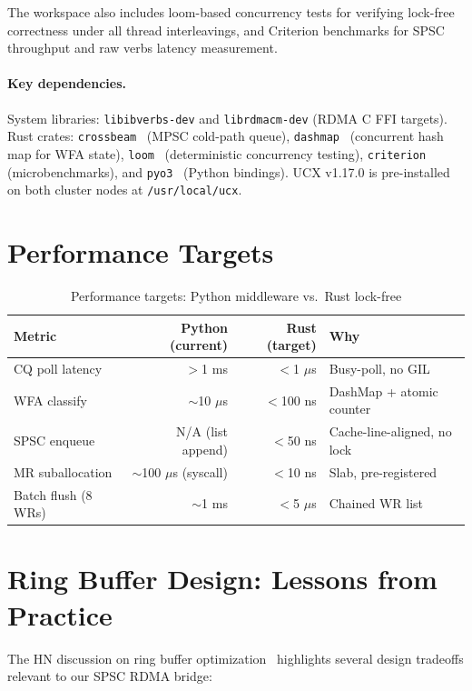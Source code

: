 \documentclass[11pt,letterpaper]{article}
\begin{document}
The workspace also includes loom-based concurrency tests for verifying lock-free correctness under all thread interleavings, and Criterion benchmarks for SPSC throughput and raw verbs latency measurement.

\paragraph{Key dependencies.}
System libraries: \texttt{libibverbs-dev} and \texttt{librdmacm-dev} (RDMA C FFI targets). Rust crates: \texttt{crossbeam}~\cite{crossbeam} (MPSC cold-path queue), \texttt{dashmap}~\cite{dashmap} (concurrent hash map for WFA state), \texttt{loom}~\cite{loom} (deterministic concurrency testing), \texttt{criterion} (microbenchmarks), and \texttt{pyo3}~\cite{pyo3} (Python bindings). UCX v1.17.0 is pre-installed on both cluster nodes at \texttt{/usr/local/ucx}.

\section{Performance Targets}

\begin{table}[htbp]
\centering
\caption{Performance targets: Python middleware vs.\ Rust lock-free}
\label{tab:perf-targets}
\begin{tabular}{@{}lrrl@{}}
\toprule
\textbf{Metric} & \textbf{Python (current)} & \textbf{Rust (target)} & \textbf{Why} \\
\midrule
CQ poll latency & $>$1 ms & $<$1 $\mu$s & Busy-poll, no GIL \\
WFA classify & $\sim$10 $\mu$s & $<$100 ns & DashMap + atomic counter \\
SPSC enqueue & N/A (list append) & $<$50 ns & Cache-line-aligned, no lock \\
MR suballocation & $\sim$100 $\mu$s (syscall) & $<$10 ns & Slab, pre-registered \\
Batch flush (8 WRs) & $\sim$1 ms & $<$5 $\mu$s & Chained WR list \\
\bottomrule
\end{tabular}
\end{table}

\section{Ring Buffer Design: Lessons from Practice}

The HN discussion on ring buffer optimization~\cite{hn-ringbuffer} highlights several design tradeoffs relevant to our SPSC RDMA bridge:
\end{document}
